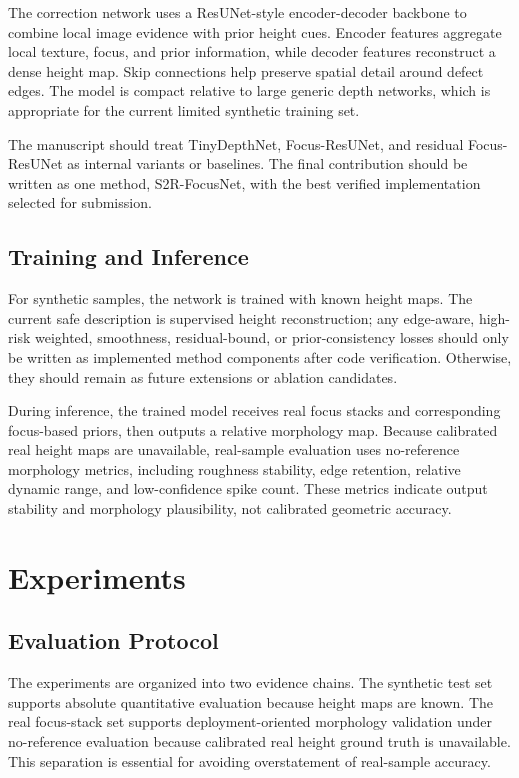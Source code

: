 \documentclass[11pt,a4paper]{article}
\newcommand{\method}{S2R-FocusNet}
\begin{document}
The correction network uses a ResUNet-style encoder-decoder backbone to combine local image evidence with prior height cues. Encoder features aggregate local texture, focus, and prior information, while decoder features reconstruct a dense height map. Skip connections help preserve spatial detail around defect edges. The model is compact relative to large generic depth networks, which is appropriate for the current limited synthetic training set.

The manuscript should treat TinyDepthNet, Focus-ResUNet, and residual Focus-ResUNet as internal variants or baselines. The final contribution should be written as one method, \method, with the best verified implementation selected for submission.

\subsection{Training and Inference}

For synthetic samples, the network is trained with known height maps. The current safe description is supervised height reconstruction; any edge-aware, high-risk weighted, smoothness, residual-bound, or prior-consistency losses should only be written as implemented method components after code verification. Otherwise, they should remain as future extensions or ablation candidates.

During inference, the trained model receives real focus stacks and corresponding focus-based priors, then outputs a relative morphology map. Because calibrated real height maps are unavailable, real-sample evaluation uses no-reference morphology metrics, including roughness stability, edge retention, relative dynamic range, and low-confidence spike count. These metrics indicate output stability and morphology plausibility, not calibrated geometric accuracy.

\section{Experiments}

\subsection{Evaluation Protocol}

The experiments are organized into two evidence chains. The synthetic test set supports absolute quantitative evaluation because height maps are known. The real focus-stack set supports deployment-oriented morphology validation under no-reference evaluation because calibrated real height ground truth is unavailable. This separation is essential for avoiding overstatement of real-sample accuracy.
\end{document}
